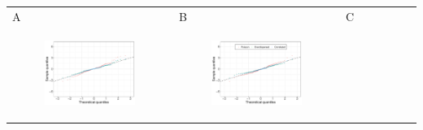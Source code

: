 \documentclass[11pt]{article}
\begin{document}
\begin{suppfigure}[ht]
	\begin{tabular}{lll}
	A&B&C\\
	\begin{subfigure}[t]{0.30\linewidth}
		\centering
		\includegraphics[width=1\linewidth]{figs/supp-figure-9a.pdf} 
	\end{subfigure}&
	\begin{subfigure}[t]{0.30\linewidth}
		\centering
		\includegraphics[width=1\linewidth]{figs/supp-figure-9b.pdf}
	\end{subfigure}&
	\begin{subfigure}[t]{0.30\linewidth}
		\centering

\end{subfigure}
\end{tabular}
\end{suppfigure}
\end{document}

